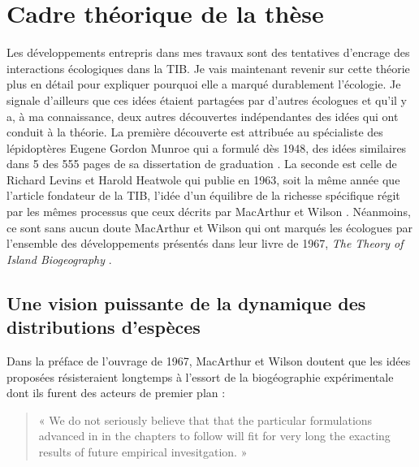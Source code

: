 \section*{Cadre théorique de la
thèse}\label{cadre-thuxe9orique-de-la-thuxe8se}

Les développements entrepris dans mes travaux sont des tentatives
d'encrage des interactions écologiques dans la TIB. Je vais maintenant
revenir sur cette théorie plus en détail pour expliquer pourquoi elle a
marqué durablement l'écologie. Je signale d'ailleurs que ces idées
étaient partagées par d'autres écologues et qu'il y a, à ma
connaissance, deux autres découvertes indépendantes des idées qui ont
conduit à la théorie. La première découverte est attribuée au
spécialiste des lépidoptères Eugene Gordon Munroe qui a formulé dès
1948, des idées similaires dans 5 des 555 pages de sa dissertation de
graduation \citep{Brown1989, Lomolino2009}. La seconde est celle de
Richard Levins et Harold Heatwole qui publie en 1963, soit la même année
que l'article fondateur de la TIB, l'idée d'un équilibre de la richesse
spécifique régit par les mêmes processus que ceux décrits par MacArthur
et Wilson \citep{Levins1963}. Néanmoins, ce sont sans aucun doute
MacArthur et Wilson qui ont marqués les écologues par l'ensemble des
développements présentés dans leur livre de 1967, \emph{The Theory of
Island Biogeography} \citep{MacArthur1967a}.

\subsection*{Une vision puissante de la dynamique des distributions
d'espèces}\label{une-vision-puissante-de-la-dynamique-des-distributions-despuxe8ces}

Dans la préface de l'ouvrage de 1967, MacArthur et Wilson doutent que
les idées proposées résisteraient longtemps à l'essort de la
biogéographie expérimentale dont ils furent des acteurs de premier plan
:

\begin{quote}
« We do not seriously believe that that the particular formulations
advanced in in the chapters to follow will fit for very long the
exacting results of future empirical invesitgation. »
\end{quote}

